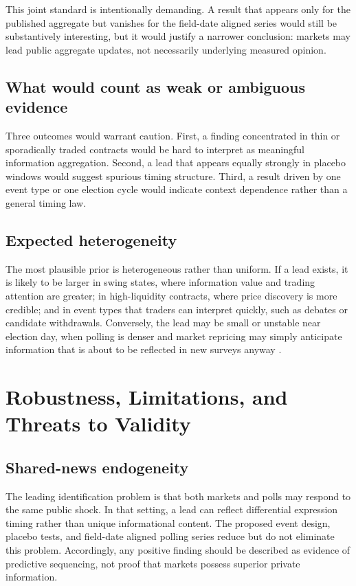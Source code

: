 \documentclass[11pt]{article}
\begin{document}
This joint standard is intentionally demanding. A result that appears only for the published aggregate but vanishes for the field-date aligned series would still be substantively interesting, but it would justify a narrower conclusion: markets may lead public aggregate updates, not necessarily underlying measured opinion.

\subsection{What would count as weak or ambiguous evidence}
Three outcomes would warrant caution. First, a finding concentrated in thin or sporadically traded contracts would be hard to interpret as meaningful information aggregation. Second, a lead that appears equally strongly in placebo windows would suggest spurious timing structure. Third, a result driven by one event type or one election cycle would indicate context dependence rather than a general timing law.

\subsection{Expected heterogeneity}
The most plausible prior is heterogeneous rather than uniform. If a lead exists, it is likely to be larger in swing states, where information value and trading attention are greater; in high-liquidity contracts, where price discovery is more credible; and in event types that traders can interpret quickly, such as debates or candidate withdrawals. Conversely, the lead may be small or unstable near election day, when polling is denser and market repricing may simply anticipate information that is about to be reflected in new surveys anyway \citep{modelsmarketsandth2021arxiv}.

\section{Robustness, Limitations, and Threats to Validity}

\subsection{Shared-news endogeneity}
The leading identification problem is that both markets and polls may respond to the same public shock. In that setting, a lead can reflect differential expression timing rather than unique informational content. The proposed event design, placebo tests, and field-date aligned polling series reduce but do not eliminate this problem. Accordingly, any positive finding should be described as evidence of predictive sequencing, not proof that markets possess superior private information.
\end{document}
